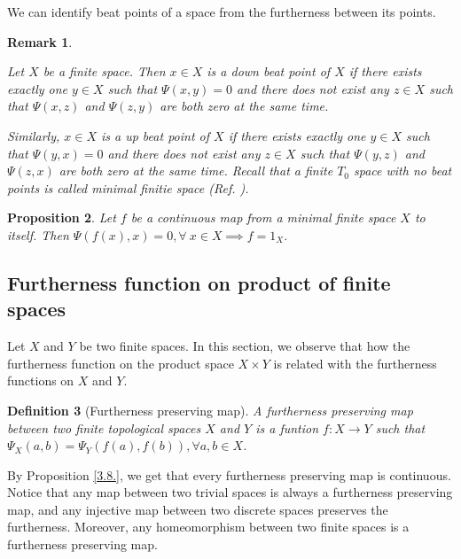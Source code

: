 \documentclass[12pt]{amsart}
\newtheorem{definition}{Definition}[section]
\newtheorem{proposition}[definition]{Proposition}
\newtheorem{remark}[definition]{Remark}
\begin{document}
We can identify beat points \cite{Barmak} of a space from the furtherness between its points.

\begin{remark}\label{3.9}
	{\normalfont
		Let $X$ be a finite space. Then $x\in X$ is a down beat point of $X$ if there exists exactly one $y\in X$ such that $\Psi(x,y)=0$ and there does not exist any $z\in X$ such that $\Psi(x,z)$ and $\Psi(z,y)$ are both zero at the same time.\par 
		Similarly, $x\in X$ is a up beat point of $X$ if there exists exactly one $y\in X$ such that $\Psi(y,x)=0$ and there does not exist any $z\in X$ such that $\Psi(y,z)$ and $\Psi(z,x)$ are both zero at the same time. Recall that a finite $T_0$ space with no beat points is called  minimal finitie space (Ref. \cite{Barmak}).
	}
\end{remark}


\begin{proposition}
	Let  $f$  be a continuous map from a minimal finite space $X$ to itself. Then $\Psi(f(x),x)=0,\forall~ x\in X\implies f=1_X$.
\end{proposition}


\subsection{\textbf{Furtherness function on product of finite spaces}}

Let $X$ and $Y$ be two finite spaces.
In this section, we observe that how the furtherness function on the product space $X\times Y$ is related with the furtherness functions on $X$ and $Y$.\\



\begin{definition}[Furtherness preserving map] A furtherness preserving map between two finite topological spaces $X$ and $Y$ is a funtion $f:X\longrightarrow Y$ such that $\Psi_{X}(a,b)=\Psi_{Y}(f(a),f(b)),\forall a,b\in X$.
	
\end{definition} 

By Proposition \ref{3.8.}, we get that every furtherness preserving map is continuous. Notice that any map between two trivial spaces is always  a furtherness preserving map, and any injective map between two discrete spaces preserves the furtherness. Moreover, any homeomorphism between two finite spaces is a furtherness preserving map.
\end{document}
